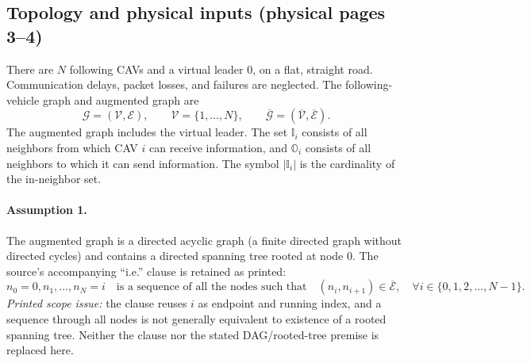 \documentclass{article}
\begin{document}
\subsection*{Topology and physical inputs (physical pages 3--4)}
There are $N$ following CAVs and a virtual leader $0$, on a flat, straight road. Communication delays, packet losses, and failures are neglected. The following-vehicle graph and augmented graph are
\[
\mathscr G=(\mathscr V,\mathscr E),\qquad
\mathscr V=\{1,\ldots,N\},\qquad
\overline{\mathscr G}=(\overline{\mathscr V},\overline{\mathscr E}).
\]
The augmented graph includes the virtual leader. The set $\mathbb I_i$ consists of all neighbors from which CAV $i$ can receive information, and $\mathbb O_i$ consists of all neighbors to which it can send information. The symbol $|\mathbb I_i|$ is the cardinality of the in-neighbor set.

\paragraph{Assumption 1.}
The augmented graph is a directed acyclic graph (a finite directed graph without directed cycles) and contains a directed spanning tree rooted at node $0$. The source's accompanying ``i.e.'' clause is retained as printed:
\[
n_0=0,n_1,\ldots,n_N=i
\quad\text{is a sequence of all the nodes such that}\quad
(n_i,n_{i+1})\in\overline{\mathscr E},
\quad\forall i\in\{0,1,2,\ldots,N-1\}.
\]
\emph{Printed scope issue:} the clause reuses $i$ as endpoint and running index, and a sequence through all nodes is not generally equivalent to existence of a rooted spanning tree. Neither the clause nor the stated DAG/rooted-tree premise is replaced here.
\end{document}
